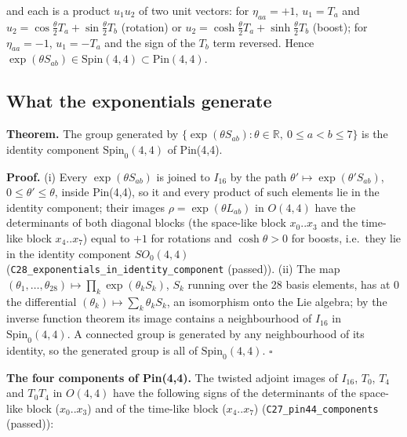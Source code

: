 \documentclass[
  10pt,
]{article}
\begin{document}
and each is a product \(u_1u_2\) of two unit vectors: for
\(\eta_{aa} = +1\), \(u_1 = T_a\) and
\(u_2 = \cos\tfrac\theta2T_a + \sin\tfrac\theta2T_b\) (rotation) or
\(u_2 = \cosh\tfrac\theta2T_a + \sinh\tfrac\theta2T_b\) (boost); for
\(\eta_{aa} = -1\), \(u_1 = -T_a\) and the sign of the \(T_b\) term
reversed. Hence
\(\exp(\theta S_{ab}) \in \mathrm{Spin}(4,4) \subset \mathrm{Pin}(4,4)\).

\hypertarget{what-the-exponentials-generate}{%
\subsection{What the exponentials
generate}\label{what-the-exponentials-generate}}

\textbf{Theorem.} The group generated by
\(\{\exp(\theta S_{ab}) : \theta \in \mathbb R,\ 0 \le a < b \le 7\}\)
is the identity component \(\mathrm{Spin}_0(4,4)\) of Pin(4,4).

\textbf{Proof.} (i) Every \(\exp(\theta S_{ab})\) is joined to
\(I_{16}\) by the path \(\theta' \mapsto \exp(\theta' S_{ab})\),
\(0 \le \theta' \le \theta\), inside Pin(4,4), so it and every product
of such elements lie in the identity component; their images
\(\rho = \exp(\theta L_{ab})\) in \(O(4,4)\) have the determinants of
both diagonal blocks (the space-like block \(x_0..x_3\) and the
time-like block \(x_4..x_7\)) equal to \(+1\) for rotations and
\(\cosh\theta > 0\) for boosts, i.e.~they lie in the identity component
\(SO_0(4,4)\) (\texttt{C28\_exponentials\_in\_identity\_component}
(passed)). (ii) The map
\((\theta_1, \dots, \theta_{28}) \mapsto \prod_k\exp(\theta_kS_k)\),
\(S_k\) running over the 28 basis elements, has at \(0\) the
differential \((\theta_k) \mapsto \sum_k\theta_kS_k\), an isomorphism
onto the Lie algebra; by the inverse function theorem its image contains
a neighbourhood of \(I_{16}\) in \(\mathrm{Spin}_0(4,4)\). A connected
group is generated by any neighbourhood of its identity, so the
generated group is all of \(\mathrm{Spin}_0(4,4)\). \(\square\)

\textbf{The four components of Pin(4,4).} The twisted adjoint images of
\(I_{16}\), \(T_0\), \(T_4\) and \(T_0T_4\) in \(O(4,4)\) have the
following signs of the determinants of the space-like block
(\(x_0..x_3\)) and of the time-like block (\(x_4..x_7\))
(\texttt{C27\_pin44\_components} (passed)):
\end{document}
